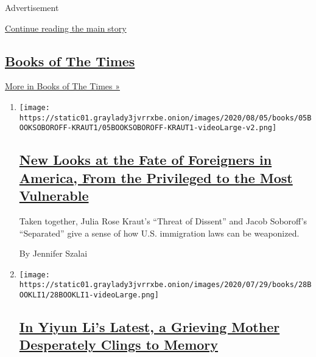 Advertisement

\protect\hyperlink{after-mid1}{Continue reading the main story}

\hypertarget{books-of-the-times-2}{%
\subsection{\texorpdfstring{\href{/column/books-of-the-times}{Books of
The Times}}{Books of The Times}}\label{books-of-the-times-2}}

\href{/column/books-of-the-times}{More in Books of The Times »}

\begin{enumerate}
\def\labelenumi{\arabic{enumi}.}
\item
  \texttt{[image: https://static01.graylady3jvrrxbe.onion/images/2020/08/05/books/05BOOKSOBOROFF-KRAUT1/05BOOKSOBOROFF-KRAUT1-videoLarge-v2.png]}

  \hypertarget{new-looks-at-the-fate-of-foreigners-in-america-from-the-privileged-to-the-most-vulnerable}{%
  \subsection{\texorpdfstring{\href{/2020/07/30/books/review-threat-dissent-julia-rose-kraut-separated-jacob-soboroff.html}{New
  Looks at the Fate of Foreigners in America, From the Privileged to the
  Most
  Vulnerable}}{New Looks at the Fate of Foreigners in America, From the Privileged to the Most Vulnerable}}\label{new-looks-at-the-fate-of-foreigners-in-america-from-the-privileged-to-the-most-vulnerable}}

  Taken together, Julia Rose Kraut's ``Threat of Dissent'' and Jacob
  Soboroff's ``Separated'' give a sense of how U.S. immigration laws can
  be weaponized.

  By Jennifer Szalai
\item
  \texttt{[image: https://static01.graylady3jvrrxbe.onion/images/2020/07/29/books/28BOOKLI1/28BOOKLI1-videoLarge.png]}

  \hypertarget{in-yiyun-lis-latest-a-grieving-mother-desperately-clings-to-memory}{%
  \subsection{\texorpdfstring{\href{/2020/07/28/books/review-must-i-go-yiyun-li.html}{In
  Yiyun Li's Latest, a Grieving Mother Desperately Clings to
  Memory}}{In Yiyun Li's Latest, a Grieving Mother Desperately Clings to Memory}}\label{in-yiyun-lis-latest-a-grieving-mother-desperately-clings-to-memory}}


\end{enumerate}
